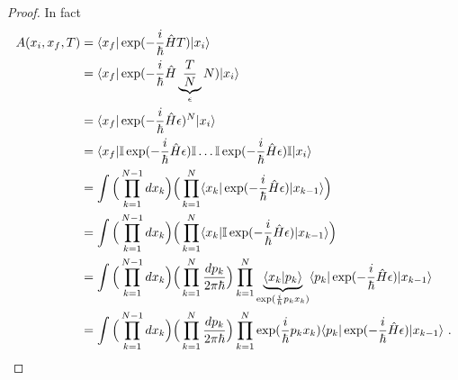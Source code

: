     \begin{proof}
        In fact 
        \begin{equation*}
        \begin{aligned}
            A (x_i, x_f, T) & = \langle x_f\vert \exp(- \frac{i}{\hbar} \hat H T) \vert x_i\rangle \\ & = \langle x_f\vert \exp(- \frac{i}{\hbar} \hat H \underbrace{\frac{T}{N}}_\epsilon N) \vert x_i\rangle \\ & = \langle x_f\vert \exp(- \frac{i}{\hbar} \hat H \epsilon)^N \vert x_i\rangle \\ & = \langle x_f\vert \mathbb I \exp(- \frac{i}{\hbar} \hat H \epsilon) \mathbb I \ldots \mathbb I \exp(- \frac{i}{\hbar} \hat H \epsilon) \mathbb I \vert x_i\rangle \\ & = \int \Big ( \prod_{k=1}^{N-1} dx_k \Big) \Big ( \prod_{k=1}^{N} \langle x_k\vert \exp(- \frac{i}{\hbar} \hat H \epsilon) \vert x_{k-1}\rangle \Big) \\ & = \int \Big ( \prod_{k=1}^{N-1} dx_k \Big) \Big ( \prod_{k=1}^{N} \langle x_k\vert \mathbb I \exp(- \frac{i}{\hbar} \hat H \epsilon) \vert x_{k-1}\rangle \Big) \\ & = \int \Big ( \prod_{k=1}^{N-1} dx_k \Big) \Big ( \prod_{k=1}^{N} \frac{dp_k}{2 \pi \hbar} \Big) \prod_{k=1}^{N}\underbrace{\langle x_k\vert p_k\rangle}_{\exp(\frac{i}{\hbar} p_k x_k)} \langle p_k\vert \exp(- \frac{i}{\hbar} \hat H \epsilon) \vert x_{k-1}\rangle \\ & = \int \Big ( \prod_{k=1}^{N-1} dx_k \Big) \Big ( \prod_{k=1}^{N} \frac{dp_k}{2 \pi \hbar} \Big) \prod_{k=1}^{N} \exp(\frac{i}{\hbar} p_k x_k) \langle p_k\vert \exp(- \frac{i}{\hbar} \hat H \epsilon) \vert x_{k-1}\rangle ~.
        \end{aligned}
        \end{equation*}


\end{proof}

